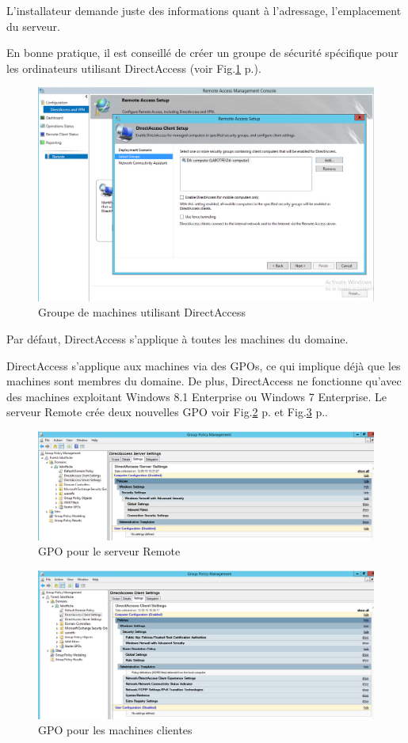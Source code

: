 L'installateur demande juste des informations quant à l'adressage, l'emplacement du serveur.

En bonne pratique, il est conseillé de créer un groupe de sécurité spécifique pour les ordinateurs utilisant DirectAccess (voir Fig.\ref{fig:gsDA} p.\pageref{fig:gsDA}).
\begin{figure}[ht]
	\centering
	\includegraphics[width=16cm]{DA/DAGroup.png}
	\caption{Groupe de machines utilisant DirectAccess}
	\label{fig:gsDA}
\end{figure}
Par défaut, DirectAccess s'applique à toutes les machines du domaine.

DirectAccess s'applique aux machines via des GPOs, ce qui implique déjà que les machines sont membres du domaine.
De plus, DirectAccess ne fonctionne qu'avec des machines exploitant Windows 8.1 Enterprise ou Windows 7 Enterprise.
Le serveur Remote crée deux nouvelles GPO voir Fig.\ref{fig:srvgpoDA} p.\pageref{fig:srvgpoDA} et Fig.\ref{fig:clientgpoDA} p.\pageref{fig:clientgpoDA}.
\begin{figure}[ht]
	\centering
	\includegraphics[width=16cm]{DA/DASrvGPO.png}
	\caption{GPO pour le serveur Remote}
	\label{fig:srvgpoDA}
\end{figure} 
\begin{figure}[ht]
	\centering
	\includegraphics[width=16cm]{DA/DAClientGPO.png}
	\caption{GPO pour les machines clientes}
	\label{fig:clientgpoDA}
\end{figure} 

